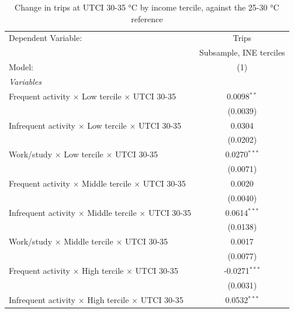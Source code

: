 
\begin{table}[htbp]
   \caption{\label{table_model_d_30-35} Change in trips at UTCI 30-35 °C by income tercile, against the 25-30 °C reference}
   \centering
   \small
   \begin{tabular}{lc}
      \tabularnewline \midrule \midrule
      Dependent Variable:                                               & Trips\\  
                                                                        & Subsample, INE terciles \\   
      Model:                                                            & (1)\\  
      \midrule
      \emph{Variables}\\
      Frequent activity $\times$ Low tercile $\times$ UTCI 30-35        & 0.0098$^{**}$\\   
                                                                        & (0.0039)\\   
      Infrequent activity $\times$ Low tercile $\times$ UTCI 30-35      & 0.0304\\   
                                                                        & (0.0202)\\   
      Work/study $\times$ Low tercile $\times$ UTCI 30-35               & 0.0270$^{***}$\\   
                                                                        & (0.0071)\\   
      Frequent activity $\times$ Middle tercile $\times$ UTCI 30-35     & 0.0020\\   
                                                                        & (0.0040)\\   
      Infrequent activity $\times$ Middle tercile $\times$ UTCI 30-35   & 0.0614$^{***}$\\   
                                                                        & (0.0138)\\   
      Work/study $\times$ Middle tercile $\times$ UTCI 30-35            & 0.0017\\   
                                                                        & (0.0077)\\   
      Frequent activity $\times$ High tercile $\times$ UTCI 30-35       & -0.0271$^{***}$\\   
                                                                        & (0.0031)\\   
      Infrequent activity $\times$ High tercile $\times$ UTCI 30-35     & 0.0532$^{***}$\\   

\end{tabular}
\end{table}
